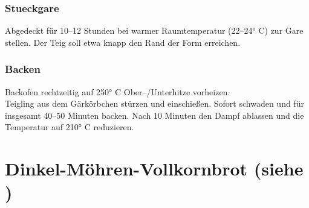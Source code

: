     \subsubsection*{\Gls{Stueckgare}} 
    Abgedeckt für 10–12 Stunden bei warmer Raumtemperatur (22–24° C) zur Gare stellen. Der Teig soll etwa knapp den Rand der Form erreichen.
    \subsubsection*{\Gls{Backen}}
    Backofen rechtzeitig auf 250° C Ober–/Unterhitze vorheizen.\\
    Teigling aus dem Gärkörbchen stürzen und einschießen. Sofort schwaden und für insgesamt 40–50
    Minuten backen. Nach 10 Minuten den Dampf ablassen und die Temperatur auf 210° C reduzieren.
    
 
\section[Dinkel-Möhren-Vollkornbrot]{Dinkel-Möhren-Vollkornbrot \textmd{(siehe \cite{sonjaDinkelMoehren2018})}} 
 

